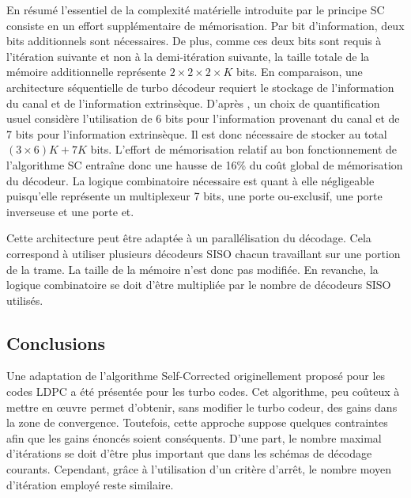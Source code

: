 En résumé l'essentiel de la complexité matérielle introduite par le principe SC consiste en un effort supplémentaire de mémorisation. Par bit 
d'information, deux bits additionnels sont nécessaires. De plus, comme ces deux bits sont 
requis à l'itération suivante et non à la demi-itération suivante, la taille totale de la mémoire additionnelle 
représente $2\times 2 \times 2 \times K$ bits. En comparaison, une architecture séquentielle de turbo décodeur requiert le stockage
de  l'information du canal et de l'information extrinsèque. D'après \cite{livre_declercq}, un choix de quantification 
usuel considère l'utilisation de 6 bits pour l'information provenant du canal et de 7 bits pour l'information extrinsèque.
Il est donc nécessaire de stocker au total $(3\times 6)K + 7 K$ bits. L'effort de mémorisation relatif au bon 
fonctionnement de l'algorithme SC entraîne donc une hausse de 16\% du coût global de mémorisation du décodeur.
La logique combinatoire nécessaire est quant à elle négligeable puisqu'elle
représente un multiplexeur 7 bits, une porte ou-exclusif, une porte inverseuse et une porte et.

Cette architecture peut être adaptée à un parallélisation du décodage. Cela correspond à utiliser plusieurs décodeurs SISO chacun 
travaillant sur une portion de la trame. La taille de la mémoire n'est donc pas modifiée. En revanche, la logique combinatoire
se doit d'être multipliée par le nombre de décodeurs SISO utilisés.


\subsection{Conclusions}
Une adaptation de l'algorithme Self-Corrected originellement proposé pour les codes LDPC a été présentée pour les turbo 
codes. Cet algorithme, peu coûteux à mettre en œuvre permet d'obtenir, sans modifier le turbo codeur, des gains dans la zone 
de convergence. Toutefois, cette approche suppose quelques contraintes afin que les gains énoncés soient
 conséquents. D'une part, le nombre maximal d'itérations se doit d'être plus important que dans les schémas de 
 décodage courants. Cependant, grâce à l'utilisation d'un critère d'arrêt, le nombre moyen d'itération employé reste 
 similaire. 


